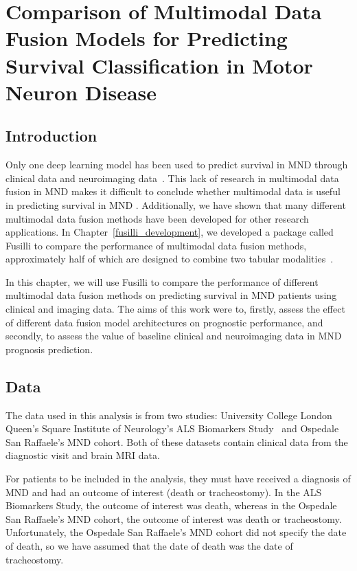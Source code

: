 \chapter{Comparison of Multimodal Data Fusion Models for Predicting Survival Classification in Motor Neuron Disease}
\label{fusilli_on_mnd}

\section{Introduction}
Only one deep learning model has been used to predict survival in MND through clinical data and neuroimaging data~\cite{vanderburghDeepLearningPredictions2017}.
This lack of research in multimodal data fusion in MND makes it difficult to conclude whether multimodal data is useful in predicting survival in MND .
Additionally, we have shown that many different multimodal data fusion methods have been developed for other research applications.
In Chapter~\ref{fusilli_development}, we developed a package called Fusilli to compare the performance of multimodal data fusion methods, approximately half of which are designed to combine two tabular modalities~\cite{townendFlorencejtFusilliFusilli2024}.

In this chapter, we will use Fusilli to compare the performance of different multimodal data fusion methods on predicting survival in MND patients using clinical and imaging data.
The aims of this work were to, firstly, assess the effect of different data fusion model architectures on prognostic performance, and secondly, to assess the value of baseline clinical and neuroimaging data in MND prognosis prediction.

\section{Data}

The data used in this analysis is from two studies: University College London Queen's Square Institute of Neurology's ALS Biomarkers Study~\cite{UKMNDCSG} and Ospedale San Raffaele's MND cohort.
Both of these datasets contain clinical data from the diagnostic visit and brain MRI data.

For patients to be included in the analysis, they must have received a diagnosis of MND and had an outcome of interest (death or tracheostomy).
In the ALS Biomarkers Study, the outcome of interest was death, whereas in the Ospedale San Raffaele's MND cohort, the outcome of interest was death or tracheostomy.
Unfortunately, the Ospedale San Raffaele's MND cohort did not specify the date of death, so we have assumed that the date of death was the date of tracheostomy.

